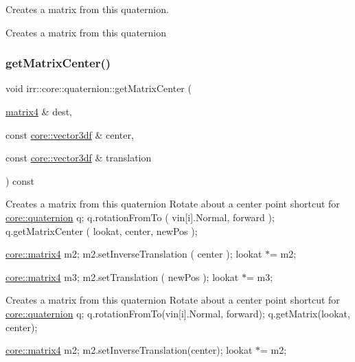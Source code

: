Creates a matrix from this quaternion. 

Creates a matrix from this quaternion \mbox{\label{classirr_1_1core_1_1quaternion_ab0ed43e2e137b42128a80f71f03dac44}} 
\subsubsection{\texorpdfstring{get\+Matrix\+Center()}{getMatrixCenter()}}
{\footnotesize\ttfamily void irr\+::core\+::quaternion\+::get\+Matrix\+Center (\begin{DoxyParamCaption}\item[{\hyperlink{namespaceirr_1_1core_a73fa92e638c5ca97efd72da307cc9b65}{matrix4} \&}]{dest,  }\item[{const \hyperlink{namespaceirr_1_1core_a06f169d08b5c429f5575acb7edbad811}{core\+::vector3df} \&}]{center,  }\item[{const \hyperlink{namespaceirr_1_1core_a06f169d08b5c429f5575acb7edbad811}{core\+::vector3df} \&}]{translation }\end{DoxyParamCaption}) const\hspace{0.3cm}{\ttfamily [inline]}}

Creates a matrix from this quaternion Rotate about a center point shortcut for \hyperlink{classirr_1_1core_1_1quaternion}{core\+::quaternion} q; q.\+rotation\+From\+To ( vin\mbox{[}i\mbox{]}.Normal, forward ); q.\+get\+Matrix\+Center ( lookat, center, new\+Pos );

\hyperlink{namespaceirr_1_1core_a73fa92e638c5ca97efd72da307cc9b65}{core\+::matrix4} m2; m2.\+set\+Inverse\+Translation ( center ); lookat $\ast$= m2;

\hyperlink{namespaceirr_1_1core_a73fa92e638c5ca97efd72da307cc9b65}{core\+::matrix4} m3; m2.\+set\+Translation ( new\+Pos ); lookat $\ast$= m3;

Creates a matrix from this quaternion Rotate about a center point shortcut for \hyperlink{classirr_1_1core_1_1quaternion}{core\+::quaternion} q; q.\+rotation\+From\+To(vin\mbox{[}i\mbox{]}.Normal, forward); q.\+get\+Matrix(lookat, center);

\hyperlink{namespaceirr_1_1core_a73fa92e638c5ca97efd72da307cc9b65}{core\+::matrix4} m2; m2.\+set\+Inverse\+Translation(center); lookat $\ast$= m2; \mbox{\label{classirr_1_1core_1_1quaternion_a75b5cb2d26397f07399e79ea20f1aff1}} 
